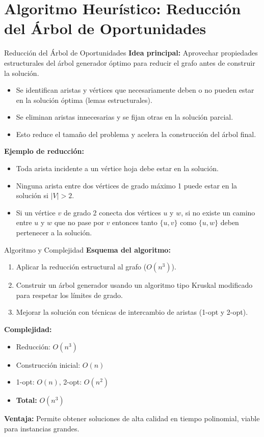 \documentclass{beamer}
\begin{document}
\section{Algoritmo Heurístico: Reducción del Árbol de Oportunidades}
\begin{frame}{Reducción del Árbol de Oportunidades}
  \textbf{Idea principal:} Aprovechar propiedades estructurales del árbol generador óptimo para reducir el grafo antes de construir la solución.
\begin{itemize}
  \item Se identifican aristas y vértices que necesariamente deben o no pueden estar en la solución óptima (lemas estructurales).
  \item Se eliminan aristas innecesarias y se fijan otras en la solución parcial.
  \item Esto reduce el tamaño del problema y acelera la construcción del árbol final.
\end{itemize}
	\textbf{Ejemplo de reducción:}
\begin{itemize}
  \item Toda arista incidente a un vértice hoja debe estar en la solución.
  \item Ninguna arista entre dos vértices de grado máximo 1 puede estar en la solución si $|V|>2$.
  \item Si un vértice $v$ de grado 2 conecta dos v\'ertices $u$ y $w$, si no existe un camino entre $u$ y $w$ que no pase por $v$ entonces tanto $\{u,v\}$ como $\{u,w\}$ deben pertenecer a la soluci\'on.
\end{itemize}
\end{frame}

\begin{frame}{Algoritmo y Complejidad}
	\textbf{Esquema del algoritmo:}
\begin{enumerate}
  \item Aplicar la reducción estructural al grafo ($O(n^3)$).
  \item Construir un árbol generador usando un algoritmo tipo Kruskal modificado para respetar los límites de grado.
  \item Mejorar la solución con técnicas de intercambio de aristas (1-opt y 2-opt).
\end{enumerate}
\vspace{0.2cm}
	\textbf{Complejidad:}
\begin{itemize}
  \item Reducción: $O(n^3)$
  \item Construcción inicial: $O(n)$
  \item 1-opt: $O(n)$, 2-opt: $O(n^2)$
  \item \textbf{Total:} $O(n^3)$
\end{itemize}
	\textbf{Ventaja:} Permite obtener soluciones de alta calidad en tiempo polinomial, viable para instancias grandes.
\end{frame}
\end{document}
